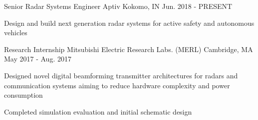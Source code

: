
\begin{cventries}

  \cventry
    {Senior Radar Systems Engineer} %
    {Aptiv} %
    {Kokomo, IN} %
    {Jun. 2018 - PRESENT} %
    {
      \begin{cvitems} %
        \item {Design and build next generation radar systems for active safety and autonomous vehicles}
      \end{cvitems}
    }

  \cventry
    {Research Internship} %
    {Mitsubishi Electric Research Labs. (MERL)} %
    {Cambridge, MA} %
    {May 2017 - Aug. 2017} %
    {
      \begin{cvitems} %
        \item {Designed novel digital beamforming transmitter architectures for radars and communication systems aiming to reduce hardware complexity and power consumption}
        \item {Completed simulation evaluation and initial schematic design}
      \end{cvitems}
    }

\end{cventries}
